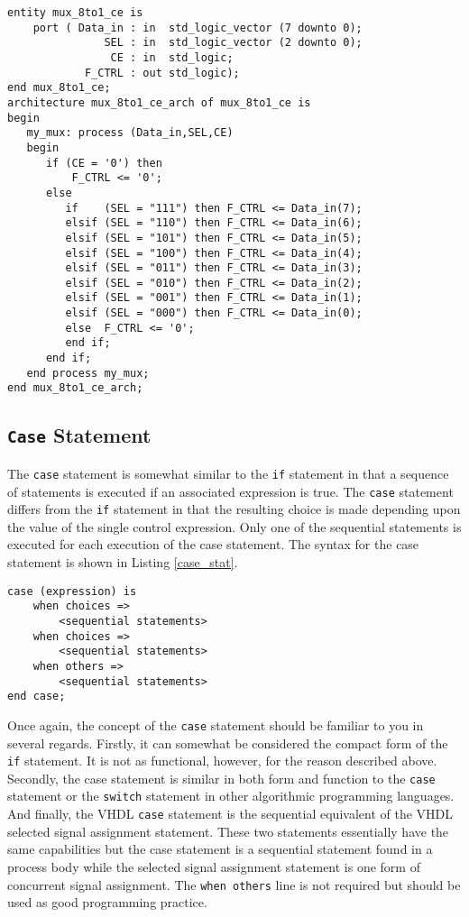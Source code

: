 \begin{lstlisting}[label=exe_11, caption=Solution to Example 11.]
entity mux_8to1_ce is
    port ( Data_in : in  std_logic_vector (7 downto 0);
               SEL : in  std_logic_vector (2 downto 0);
                CE : in  std_logic;
            F_CTRL : out std_logic);  
end mux_8to1_ce;
architecture mux_8to1_ce_arch of mux_8to1_ce is 
begin
   my_mux: process (Data_in,SEL,CE)
   begin
      if (CE = '0') then 
          F_CTRL <= '0'; 
      else 
         if    (SEL = "111") then F_CTRL <= Data_in(7); 
         elsif (SEL = "110") then F_CTRL <= Data_in(6); 
         elsif (SEL = "101") then F_CTRL <= Data_in(5); 
         elsif (SEL = "100") then F_CTRL <= Data_in(4); 
         elsif (SEL = "011") then F_CTRL <= Data_in(3); 
         elsif (SEL = "010") then F_CTRL <= Data_in(2); 
         elsif (SEL = "001") then F_CTRL <= Data_in(1); 
         elsif (SEL = "000") then F_CTRL <= Data_in(0); 
         else  F_CTRL <= '0'; 
         end if; 
      end if; 
   end process my_mux; 
end mux_8to1_ce_arch; 
\end{lstlisting}

\newpage\clearpage
\subsection{\texttt{Case} Statement}
The \texttt{case} statement is somewhat similar to the \texttt{if} statement in that a sequence of statements is executed if an associated expression is true. The \texttt{case} statement differs from the \texttt{if} statement in that the resulting choice is made depending upon the value of the single control expression. Only one of the sequential statements is executed for each execution of the case statement. The syntax for the case statement is shown in Listing \ref{case_stat}.
\begin{lstlisting}[label=case_stat, caption=Syntax for the \textit{case} statement.]
case (expression) is
	when choices =>
		<sequential statements>
	when choices =>
		<sequential statements>
	when others =>
		<sequential statements>
end case;
\end{lstlisting}

Once again, the concept of the \texttt{case} statement should be familiar to you in several regards. Firstly, it can somewhat be considered the compact form of the \texttt{if} statement. It is not as functional, however, for the reason described above. Secondly, the case statement is similar in both form and function to the \texttt{case} statement or the \texttt{switch} statement in other algorithmic programming languages. And finally, the VHDL \texttt{case} statement is the sequential equivalent of the VHDL selected signal assignment statement. These two statements essentially have the same capabilities but the case statement is a sequential statement found in a process body while the selected signal assignment statement is one form of concurrent signal assignment. The  \texttt{when others} line is not required but should be used as good programming practice.

